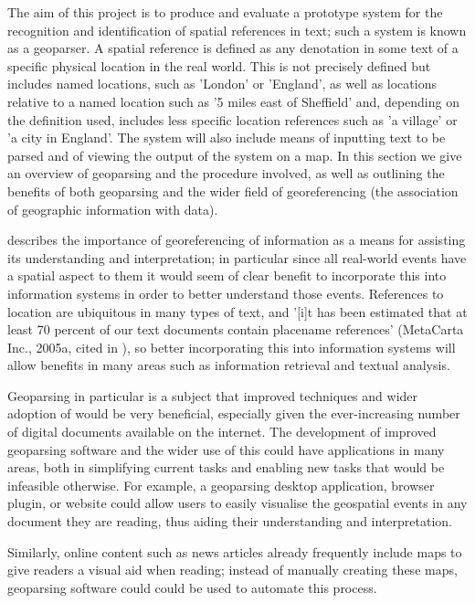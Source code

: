 \documentclass[12pt, a4paper]{report}
\begin{document}
The aim of this project is to produce and evaluate a prototype system for the recognition and identification of spatial references in text; such a system is known as a geoparser. A spatial reference is defined as any denotation in some text of a specific physical location in the real world. This is not precisely defined but includes named locations, such as 'London' or 'England', as well as locations relative to a named location such as '5 miles east of Sheffield' and, depending on the definition used, includes less specific location references such as 'a village' or 'a city in England'. The system will also include means of inputting text to be parsed and of viewing the output of the system on a map. In this section we give an overview of geoparsing and the procedure involved, as well as outlining the benefits of both geoparsing and the wider field of georeferencing (the association of geographic information with data). 

\citet{hill2006} describes the importance of georeferencing of information as a means for assisting its understanding and interpretation; in particular since all real-world events have a spatial aspect to them it would seem of clear benefit to incorporate this into information systems in order to better understand those events. References to location are ubiquitous in many types of text, and '[i]t has been estimated that at least 70 percent of our text documents contain placename references' (MetaCarta Inc., 2005a, cited in \citet[p.~5]{hill2006}), so better incorporating this into information systems will allow benefits in many areas such as information retrieval and textual analysis. %

Geoparsing in particular is a subject that improved techniques and wider adoption of would be very beneficial, especially given the ever-increasing number of digital documents available on the internet. The development of improved geoparsing software and the wider use of this could have applications in many areas, both in simplifying current tasks and enabling new tasks that would be infeasible otherwise. For example, a geoparsing desktop application, browser plugin, or website could allow users to easily visualise the geospatial events in any document they are reading, thus aiding their understanding and interpretation.

Similarly, online content such as news articles already frequently include maps to give readers a visual aid when reading; instead of manually creating these maps, geoparsing software could could be used to automate this process.
\end{document}
